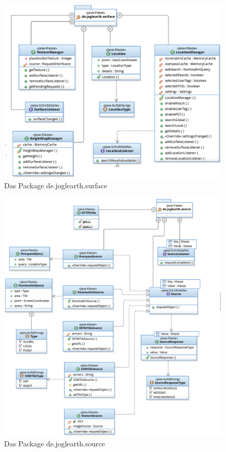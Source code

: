 \documentclass[10pt]{scrreprt}
\begin{document}
\begin{figure}[!htb]
\begin{center}
	\includegraphics[scale=0.55]{de_joglearth_surface.eps}
\end{center}
\caption{Das Package de.joglearth.surface}
\end{figure}


\begin{figure}[!htb]
\begin{center}
	\includegraphics[scale=0.55]{de_joglearth_source.eps}
\end{center}
\caption{Das Package de.joglearth.source}
\end{figure}
\end{document}

